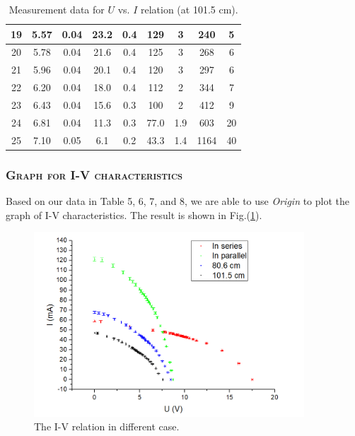 \documentclass[a4paper,12pt]{article}
\begin{document}
\begin{table}[H]
\begin{center}
\begin{tabular}{|c|c|c|c|c|c|c|c|c|}
    19    & 5.57  & 0.04  & 23.2  & 0.4   & 129   & 3     & 240   & 5  \\ \hline
    20    & 5.78  & 0.04  & 21.6  & 0.4   & 125   & 3     & 268   & 6  \\ \hline
    21    & 5.96  & 0.04  & 20.1  & 0.4   & 120   & 3     & 297   & 6  \\ \hline
    22    & 6.20  & 0.04  & 18.0  & 0.4   & 112   & 2     & 344   & 7  \\ \hline
    23    & 6.43  & 0.04  & 15.6  & 0.3   & 100   & 2     & 412   & 9  \\ \hline
    24    & 6.81  & 0.04  & 11.3  & 0.3   & 77.0  & 1.9   & 603   & 20  \\ \hline
    25    & 7.10  & 0.05  & 6.1   & 0.2   & 43.3  & 1.4   & 1164  & 40  \\ \hline
\end{tabular}
\caption{Measurement data for $U$ vs. $I$ relation (at 101.5 cm).}
\end{center}
\end{table}

\subsubsection{\textsc{Graph for I-V characteristics}}
Based on our data in Table 5, 6, 7, and 8, we are able to use \textit{Origin} to plot the graph of I-V characteristics. The result is shown in Fig.(\ref{IU}).
\begin{figure}[htb] 
    \centering
    \includegraphics[width=0.9\textwidth]{IU} 
    \caption{The I-V relation in different case.} 
    \label{IU}    
\end{figure}
\end{document}

